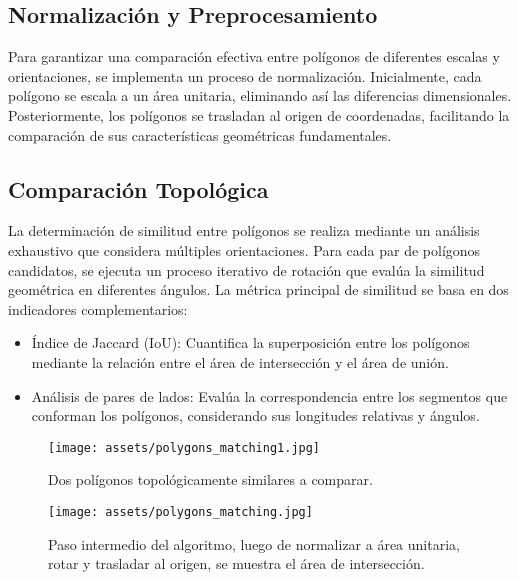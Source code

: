 \documentclass[twocolumn, fontsize=10pt]{article}
\begin{document}
\subsection{Normalización y Preprocesamiento}

Para garantizar una comparación efectiva entre polígonos de diferentes escalas y orientaciones, se implementa un proceso de normalización. Inicialmente, cada polígono se escala a un área unitaria, eliminando así las diferencias dimensionales. Posteriormente, los polígonos se trasladan al origen de coordenadas, facilitando la comparación de sus características geométricas fundamentales.

\subsection{Comparación Topológica}

La determinación de similitud entre polígonos se realiza mediante un análisis exhaustivo que considera múltiples orientaciones. Para cada par de polígonos candidatos, se ejecuta un proceso iterativo de rotación que evalúa la similitud geométrica en diferentes ángulos. La métrica principal de similitud se basa en dos indicadores complementarios:

\begin{itemize}
    \item Índice de Jaccard (IoU): \cite{jaccard} Cuantifica la superposición entre los polígonos mediante la relación entre el área de intersección y el área de unión.
    \item Análisis de pares de lados: Evalúa la correspondencia entre los segmentos que conforman los polígonos, considerando sus longitudes relativas y ángulos.
\end{itemize}

\begin{figure}[H]
    \centering
    \texttt{[image: assets/polygons\_matching1.jpg]}
    \caption{Dos polígonos topológicamente similares a comparar.}
    \label{fig:polygons_matching1}
\end{figure}

\begin{figure}[H]
    \centering
    \texttt{[image: assets/polygons\_matching.jpg]}
    \caption{Paso intermedio del algoritmo, luego de normalizar a área unitaria, rotar y trasladar al origen, se muestra el área de intersección.}
    \label{fig:polygons_matching}
\end{figure}
\end{document}
